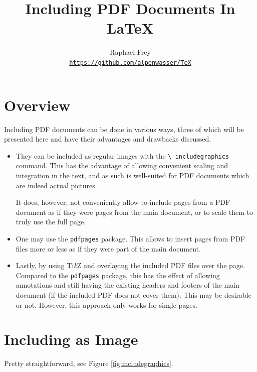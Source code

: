 \documentclass[a4paper,oneside]{article}
\title{Including PDF Documents In \LaTeX}
\author{Raphael Frey\\[2mm]\small%
    \href{https://github.com/alpenwasser/TeX/tree/master/include-pdfs}
         {\nolinkurl{https://github.com/alpenwasser/TeX}}}
\newcommand\code[1]{\texttt{#1}}
\begin{document}
\maketitle

\tableofcontents

\section{Overview}

Including PDF documents  can be done in  various ways, three of  which will be
presented here and have their advantages and drawbacks discussed.

\begin{itemize}
    \item
        They can be  included as regular images  with the \code{\textbackslash
        includegraphics}   command. This  has   the   advantage  of   allowing
        convenient  scaling  and integration  in  the  text,  and as  such  is
        well-suited for PDF documents which are indeed actual pictures.

        It does, however,  not conveniently allow to include pages  from a PDF
        document as  if they were  pages from the  main document, or  to scale
        them to truly use the full page.
    \item
        One may use  the \code{pdfpages} package. This allows  to insert pages
        from PDF files more or less as if they were part of the main document.
    \item
        Lastly, by  using Ti\emph{k}Z  and overlaying  the included  PDF files
        over the page. Compared  to the \code{pdfpages} package,  this has the
        effect of allowing  annotations and still having  the existing headers
        and footers of  the main document (if the included  PDF does not cover
        them). This may be desirable or not. However, this approach only works
        for single pages.
\end{itemize}

\clearpage
\section{Including as Image}
\label{sec:includegraphics}

Pretty straightforward, see Figure \ref{fig:includegraphics}.
\end{document}
